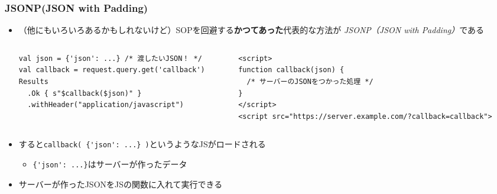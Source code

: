 \begin{frame}[fragile]
  \frametitle{JSONP(JSON with Padding)}
  
  \begin{itemize}    
    \item （他にもいろいろあるかもしれないけど）SOPを回避する\textbf{かつてあった}代表的な方法が
    \emph{JSONP（JSON with Padding）}である

    \pause
    \begin{columns}
      \begin{column}{.5\textwidth}
\begin{lstlisting}[style=scala, caption={サーバー}]
val json = {'json': ...} /* 渡したいJSON！ */
val callback = request.query.get('callback')
Results
  .Ok { s"$callback($json)" }
  .withHeader("application/javascript")
\end{lstlisting}
      \end{column}
      \begin{column}{.5\textwidth}
\begin{lstlisting}[style=html, caption={HTML}]
<script>
function callback(json) {
  /* サーバーのJSONをつかった処理 */
}
</script>
<script src="https://server.example.com/?callback=callback">
\end{lstlisting}        
      \end{column}
    \end{columns}

    \item すると\lstinline|callback( {'json': ...} )|というようなJSがロードされる
    \begin{itemize}
      \item \lstinline|{'json': ...}|はサーバーが作ったデータ
    \end{itemize}

    \pause
    \item サーバーが作ったJSONをJSの関数に入れて実行できる
  \end{itemize}
\end{frame}

